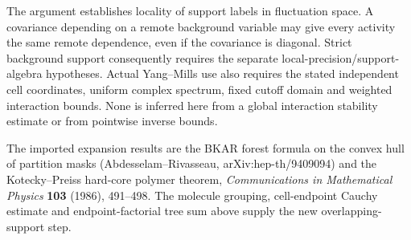 \documentclass[11pt]{article}
\begin{document}
The argument establishes locality of support labels in fluctuation
space. A covariance depending on a remote background variable may
give every activity the same remote dependence, even if the
covariance is diagonal. Strict background support consequently
requires the separate local-precision/support-algebra hypotheses.
Actual Yang--Mills use also requires the stated independent cell
coordinates, uniform complex spectrum, fixed cutoff domain and
weighted interaction bounds. None is inferred here from a global
interaction stability estimate or from pointwise inverse bounds.

The imported expansion results are the BKAR forest formula on the
convex hull of partition masks (Abdesselam--Rivasseau,
arXiv:hep-th/9409094) and the Kotecky--Preiss hard-core polymer
theorem, \emph{Communications in Mathematical Physics} \textbf{103}
(1986), 491--498. The molecule grouping, cell-endpoint Cauchy
estimate and endpoint-factorial tree sum above supply the new
overlapping-support step.
\end{document}
